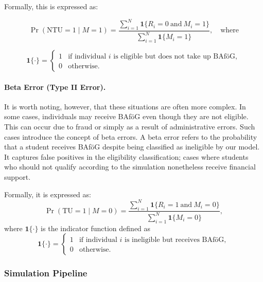 Formally, this is expressed as:

\begin{equation}
\Pr(\text{NTU} = 1 \mid M = 1) = \frac{\sum_{i=1}^{N} \mathbf{1}\{R_i = 0 \ \text{and} \ M_i = 1\}}{\sum_{i=1}^{N} \mathbf{1}\{M_i = 1\}}, \quad\text{where} 
\end{equation}

\begin{equation}
  \mathbf{1}\{\cdot\} =
  \begin{cases}
  1 & \text{if individual } i \text{ is eligible but does not take up BAföG}, \\
  0 & \text{otherwise}.
  \end{cases}
\label{eq:indicator-function-ntu}
\end{equation}


\paragraph{Beta Error (Type II Error).}  
It is worth noting, however, that these situations are often more complex. 
In some cases, individuals may receive BAföG even though they are not eligible. 
This can occur due to fraud or simply as a result of administrative errors. 
Such cases introduce the concept of beta errors. 
A beta error refers to the probability that a student receives BAföG despite being classified as ineligible by our model. 
It captures false positives in the eligibility classification; cases where students who should not qualify according to the simulation nonetheless receive financial support.

Formally, it is expressed as:
\begin{equation}
\Pr(\text{TU} = 1 \mid M = 0) = \frac{\sum_{i=1}^{N} \mathbf{1}\{R_i = 1 \ \text{and} \ M_i = 0\}}{\sum_{i=1}^{N} \mathbf{1}\{M_i = 0\}},
\end{equation}
where \( \mathbf{1}\{\cdot\} \) is the indicator function defined as
\[
\mathbf{1}\{\cdot\} =
\begin{cases}
1 & \text{if individual } i \text{ is ineligible but receives BAföG}, \\
0 & \text{otherwise}.
\end{cases}
\]

\subsubsection{Simulation Pipeline}

